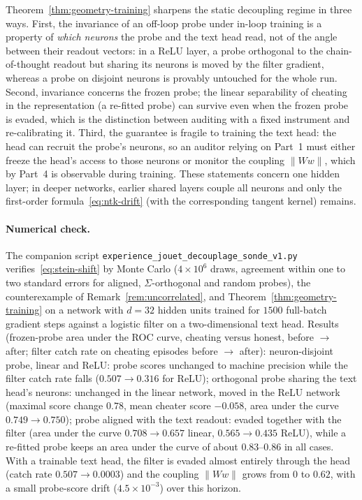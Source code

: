 \begin{remark}
Theorem~\ref{thm:geometry-training} sharpens the static decoupling regime in three ways. First, the invariance of an off-loop probe under in-loop training is a property of \emph{which neurons} the probe and the text head read, not of the angle between their readout vectors: in a ReLU layer, a probe orthogonal to the chain-of-thought readout but sharing its neurons is moved by the filter gradient, whereas a probe on disjoint neurons is provably untouched for the whole run. Second, invariance concerns the frozen probe; the linear separability of cheating in the representation (a re-fitted probe) can survive even when the frozen probe is evaded, which is the distinction between auditing with a fixed instrument and re-calibrating it. Third, the guarantee is fragile to training the text head: the head can recruit the probe's neurons, so an auditor relying on Part~1 must either freeze the head's access to those neurons or monitor the coupling $\|Ww\|$, which by Part~4 is observable during training. These statements concern one hidden layer; in deeper networks, earlier shared layers couple all neurons and only the first-order formula~\eqref{eq:ntk-drift} (with the corresponding tangent kernel) remains.
\end{remark}

\paragraph{Numerical check.} The companion script \texttt{experience\_jouet\_decouplage\_sonde\_v1.py} verifies~\eqref{eq:stein-shift} by Monte Carlo ($4 \times 10^6$ draws, agreement within one to two standard errors for aligned, $\Sigma$-orthogonal and random probes), the counterexample of Remark~\ref{rem:uncorrelated}, and Theorem~\ref{thm:geometry-training} on a network with $d = 32$ hidden units trained for $1500$ full-batch gradient steps against a logistic filter on a two-dimensional text head. Results (frozen-probe area under the ROC curve, cheating versus honest, before $\to$ after; filter catch rate on cheating episodes before $\to$ after): neuron-disjoint probe, linear and ReLU: probe scores unchanged to machine precision while the filter catch rate falls ($0.507 \to 0.316$ for ReLU); orthogonal probe sharing the text head's neurons: unchanged in the linear network, moved in the ReLU network (maximal score change $0.78$, mean cheater score $-0.058$, area under the curve $0.749 \to 0.750$); probe aligned with the text readout: evaded together with the filter (area under the curve $0.708 \to 0.657$ linear, $0.565 \to 0.435$ ReLU), while a re-fitted probe keeps an area under the curve of about $0.83$--$0.86$ in all cases. With a trainable text head, the filter is evaded almost entirely through the head (catch rate $0.507 \to 0.0003$) and the coupling $\|Ww\|$ grows from $0$ to $0.62$, with a small probe-score drift ($4.5 \times 10^{-3}$) over this horizon.
